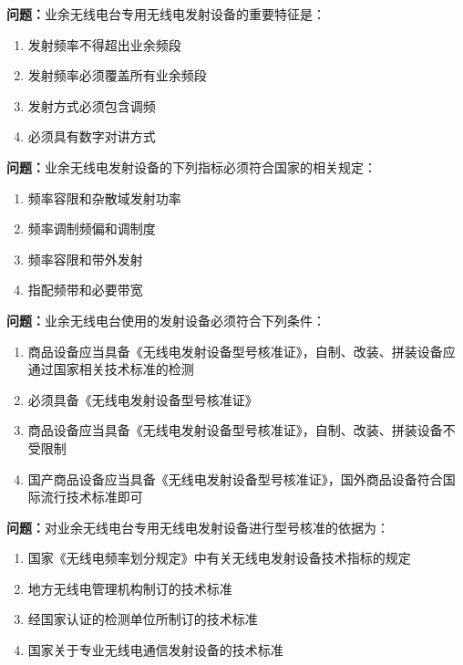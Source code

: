 \bigskip


\noindent\textbf{问题：}业余无线电台专用无线电发射设备的重要特征是：
\begin{enumerate}[label=\Alph*), leftmargin=3em]
\item 发射频率不得超出业余频段
\item 发射频率必须覆盖所有业余频段
\item 发射方式必须包含调频
\item 必须具有数字对讲方式
\end{enumerate}

\bigskip


\noindent\textbf{问题：}业余无线电发射设备的下列指标必须符合国家的相关规定：
\begin{enumerate}[label=\Alph*), leftmargin=3em]
\item 频率容限和杂散域发射功率
\item 频率调制频偏和调制度
\item 频率容限和带外发射
\item 指配频带和必要带宽
\end{enumerate}

\bigskip


\noindent\textbf{问题：}业余无线电台使用的发射设备必须符合下列条件：
\begin{enumerate}[label=\Alph*), leftmargin=3em]
\item 商品设备应当具备《无线电发射设备型号核准证》，自制、改装、拼装设备应通过国家相关技术标准的检测
\item 必须具备《无线电发射设备型号核准证》
\item 商品设备应当具备《无线电发射设备型号核准证》，自制、改装、拼装设备不受限制
\item 国产商品设备应当具备《无线电发射设备型号核准证》，国外商品设备符合国际流行技术标准即可
\end{enumerate}

\bigskip


\noindent\textbf{问题：}对业余无线电台专用无线电发射设备进行型号核准的依据为：
\begin{enumerate}[label=\Alph*), leftmargin=3em]
\item 国家《无线电频率划分规定》中有关无线电发射设备技术指标的规定
\item 地方无线电管理机构制订的技术标准
\item 经国家认证的检测单位所制订的技术标准
\item 国家关于专业无线电通信发射设备的技术标准
\end{enumerate}

